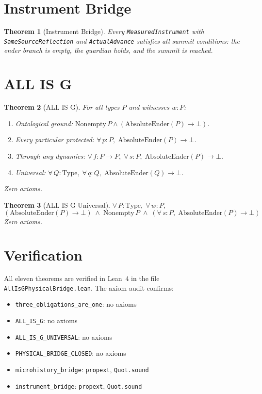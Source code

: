 \documentclass[12pt,a4paper]{article}
\newtheorem{theorem}{Theorem}[section]
\begin{document}
\section{Instrument Bridge}

\begin{theorem}[Instrument Bridge]\label{thm:instrument}
Every \texttt{MeasuredInstrument} with \texttt{SameSourceReflection} and
\texttt{ActualAdvance} satisfies all summit conditions: the ender branch
is empty, the guardian holds, and the summit is reached.
\end{theorem}

\section{ALL IS G}

\begin{theorem}[ALL IS G]\label{thm:all}
For all types $P$ and witnesses $w : P$:
\begin{enumerate}
    \item Ontological ground: $\text{Nonempty}\, P \wedge (\text{AbsoluteEnder}(P) \to \bot)$.
    \item Every particular protected: $\forall\, p : P,\; \text{AbsoluteEnder}(P) \to \bot$.
    \item Through any dynamics: $\forall\, f : P \to P,\; \forall\, s : P,\; \text{AbsoluteEnder}(P) \to \bot$.
    \item Universal: $\forall\, Q : \text{Type},\; \forall\, q : Q,\; \text{AbsoluteEnder}(Q) \to \bot$.
\end{enumerate}
Zero axioms.
\end{theorem}

\begin{theorem}[ALL IS G Universal]\label{thm:universal}
$\forall\, P : \text{Type},\; \forall\, w : P,$
\[
(\text{AbsoluteEnder}(P) \to \bot)
\;\wedge\; \text{Nonempty}\, P
\;\wedge\; (\forall\, s : P,\; \text{AbsoluteEnder}(P) \to \bot)
\]
Zero axioms.
\end{theorem}

\section{Verification}

All eleven theorems are verified in Lean~4 in the file
\texttt{AllIsGPhysicalBridge.lean}. The axiom audit confirms:
\begin{itemize}
    \item \texttt{three\_obligations\_are\_one}: no axioms
    \item \texttt{ALL\_IS\_G}: no axioms
    \item \texttt{ALL\_IS\_G\_UNIVERSAL}: no axioms
    \item \texttt{PHYSICAL\_BRIDGE\_CLOSED}: no axioms
    \item \texttt{microhistory\_bridge}: \texttt{propext}, \texttt{Quot.sound}
    \item \texttt{instrument\_bridge}: \texttt{propext}, \texttt{Quot.sound}
\end{itemize}
\end{document}
